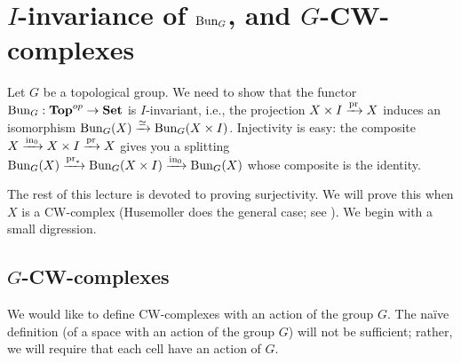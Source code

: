 \section{$I$-invariance of $\mathrm{Bun}_G$, and $G$-CW-complexes}
Let $G$ be a topological group. We need to show that the functor
$\mathrm{Bun}_G:\mathbf{Top}^{op}\to\mathbf{Set}$ is $I$-invariant, i.e., the projection
$X\times I\xrightarrow{\mathrm{pr}}X$ induces an isomorphism
$\mathrm{Bun}_G(X)\xrightarrow{\simeq}\mathrm{Bun}_G(X\times I)$.
Injectivity is easy: the composite $X\xrightarrow{\mathrm{in}_0} X\times
I\xrightarrow{\mathrm{pr}}X$ gives you a splitting
$\mathrm{Bun}_G(X)\xrightarrow{\mathrm{pr}_\ast}\mathrm{Bun}_G(X\times I)\xrightarrow{\mathrm{in}_0}\mathrm{Bun}_G(X)$
whose composite is the identity.

The rest of this lecture is devoted to proving surjectivity. We will prove this
when $X$ is a CW-complex (Husemoller does the general case; see \cite[\S
4.9]{husemoller}). We begin with a small digression.
\subsection{$G$-CW-complexes}
We would like to define CW-complexes with an action of the group $G$. The
na\"ive definition (of a space with an action of the group $G$) will not be
sufficient; rather, we will require that each cell have an action of $G$.

